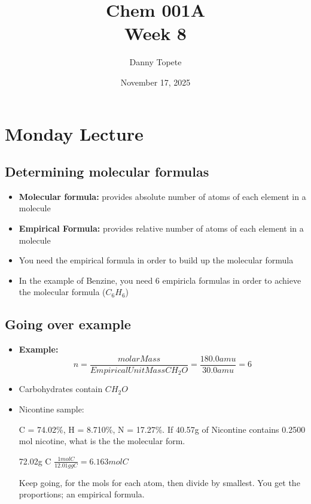 \documentclass{article}
\title{Chem 001A\\ Week 8}
\author{Danny Topete}
\date{November 17, 2025}
\begin{document}
\maketitle

\section{Monday Lecture}

\subsection{Determining molecular formulas}

\begin{itemize}
  \item \textbf{Molecular formula:} provides absolute number of atoms of each element in a molecule
  \item \textbf{Empirical Formula:} provides relative number of atoms of each element in a molecule
  \item You need the empirical formula in order to build up the molecular formula
  \item In the example of Benzine, you need 6 empiricla formulas in order to achieve the molecular formula ($C_6H_6$)
\end{itemize}

\subsection{Going over example}
\begin{itemize}
\item \textbf{Example:}
  $$ n = \frac{molarMass}{EmpiricalUnitMass CH_2O} = \frac{180.0 amu}{30.0 amu} = 6 $$
\item Carbohydrates contain $CH_2O $
\item Nicontine sample:

  C = 74.02\%, H = 8.710\%, N = 17.27\%. If 40.57g of Nicontine contains 0.2500 mol nicotine, what is the
  the molecular form.

  72.02g C $\frac{1 mol C}{ 12.01g gC} = 6.163 mol C$

  Keep going, for the mols for each atom, then divide by smallest. You get the proportions; an empirical formula.
\end{itemize}
\end{document}
